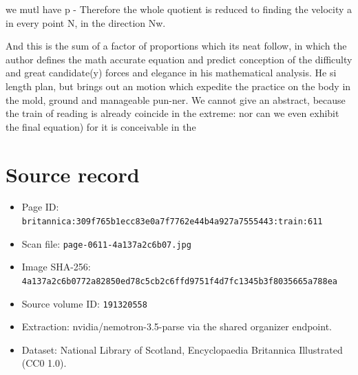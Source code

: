 \documentclass{article}
\begin{document}
we mutl have p - Therefore the whole quotient is reduced to finding the velocity a in every point N, in the direction Nw.

And this is the sum of a factor of proportions which its neat follow, in which the author defines the math accurate equation and predict conception of the difficulty and great candidate(y) forces and elegance in his mathematical analysis. He si length plan, but brings out an motion which expedite the practice on the body in the mold, ground and manageable pun-ner. We cannot give an abstract, because the train of reading is already coincide in the extreme: nor can we even exhibit the final equation) for it is conceivable in the

\section*{Source record}
\begin{itemize}
\item Page ID: \texttt{britannica:309f765b1ecc83e0a7f7762e44b4a927a7555443:train:611}
\item Scan file: \texttt{page-0611-4a137a2c6b07.jpg}
\item Image SHA-256: \texttt{4a137a2c6b0772a82850ed78c5cb2c6ffd9751f4d7fc1345b3f8035665a788ea}
\item Source volume ID: \texttt{191320558}
\item Extraction: nvidia/nemotron-3.5-parse via the shared organizer endpoint.
\item Dataset: National Library of Scotland, Encyclopaedia Britannica Illustrated (CC0 1.0).
\end{itemize}
\end{document}
